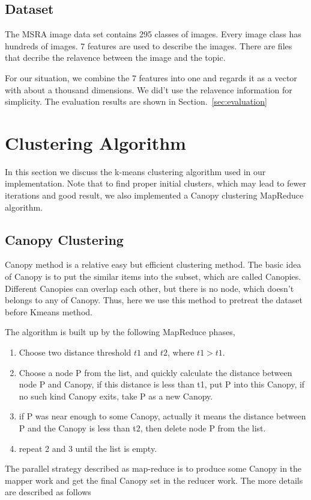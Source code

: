\documentclass[a4paper,11pt]{article}
\begin{document}
\subsection{Dataset}
The MSRA image data set contains 295 classes of images. Every image class
has hundreds of images. 7 features are used to describe the images. There are
files that decribe the relavence between the image and the topic.

For our situation, we combine the 7 features into one and regards it as a vector
with about a thousand dimensions. We did't use the relavence information for
simplicity. The evaluation results are shown in Section.~\ref{sec:evaluation}

\section{Clustering Algorithm}
In this section we discuss the k-means clustering algorithm used in our
implementation. Note that to find proper initial clusters, which may lead to
fewer iterations and good result, we also implemented a Canopy clustering
MapReduce algorithm.
\subsection{Canopy Clustering}
Canopy method is a relative easy but efficient clustering method. The basic
idea of Canopy is to put the similar items into the subset, which are called
Canopies. Different Canopies can overlap each other, but there is no node,
which doesn't belongs to any of Canopy. Thus, here we use this method to
pretreat the dataset before Kmeans method.

The algorithm is built up by the following MapReduce phases,
\begin{enumerate}
  \item Choose two distance threshold $t1$ and $t2$, where $t1>t1$.	
  \item Choose a node P from the list, and quickly calculate the distance
  between node P and Canopy, if this distance is less than t1, put P into this
  Canopy, if no such kind Canopy exits, take P as a new Canopy.
  \item if P was near enough to some Canopy, actually it means the distance
  between P and the Canopy is less than t2, then delete node P from the list.
  \item repeat 2 and 3 until the list is empty.
\end{enumerate}
The parallel strategy described as map-reduce is to produce some Canopy in the
mapper work and get the final Canopy set in the reducer work. The more details
are described as follows
\end{document}
